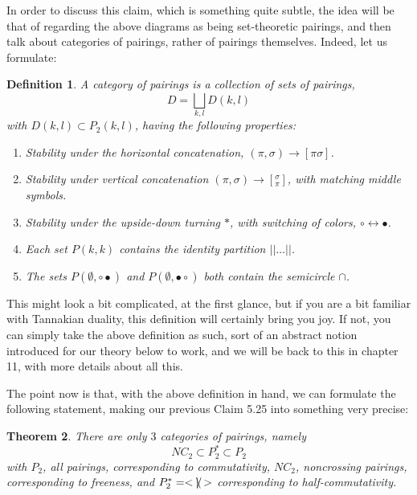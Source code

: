 \documentclass[12pt]{amsbook}
\newtheorem{theorem}{Theorem}[chapter]
\newtheorem{definition}[theorem]{Definition}
\begin{document}
In order to discuss this claim, which is something quite subtle, the idea will be that of regarding the above diagrams as being set-theoretic pairings, and then talk about categories of pairings, rather of pairings themselves. Indeed, let us formulate:

\begin{definition}
A category of pairings is a collection of sets of pairings,
$$D=\bigsqcup_{k,l}D(k,l)$$
with $D(k,l)\subset P_2(k,l)$, having the following properties:
\begin{enumerate}
\item Stability under the horizontal concatenation, $(\pi,\sigma)\to[\pi\sigma]$.

\item Stability under vertical concatenation $(\pi,\sigma)\to[^\sigma_\pi]$, with matching middle symbols.

\item Stability under the upside-down turning $*$, with switching of colors, $\circ\leftrightarrow\bullet$.

\item Each set $P(k,k)$ contains the identity partition $||\ldots||$.

\item The sets $P(\emptyset,\circ\bullet)$ and $P(\emptyset,\bullet\circ)$ both contain the semicircle $\cap$.
\end{enumerate}
\end{definition} 

This might look a bit complicated, at the first glance, but if you are a bit familiar with Tannakian duality, this definition will certainly bring you joy. If not, you can simply take the above definition as such, sort of an abstract notion introduced for our theory below to work, and we will be back to this in chapter 11, with more details about all this.

\bigskip

The point now is that, with the above definition in hand, we can formulate the following statement, making our previous Claim 5.25 into something very precise:

\begin{theorem}
There are only $3$ categories of pairings, namely
$$NC_2\subset P_2^*\subset P_2$$
with $P_2$, all pairings, corresponding to commutativity, $NC_2$, noncrossing pairings, corresponding to freeness, and $P_2^*=<\slash\hskip-2.0mm\backslash\hskip-1.7mm|\hskip0.5mm>$ corresponding to half-commutativity.
\end{theorem}
\end{document}

